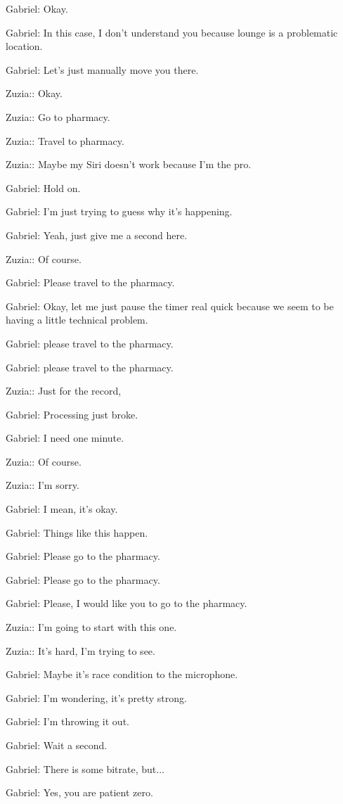 Gabriel: Okay.

Gabriel: In this case, I don't understand you because lounge is a problematic location.

Gabriel: Let's just manually move you there.

Zuzia:: Okay.

Zuzia:: Go to pharmacy.

Zuzia:: Travel to pharmacy.

Zuzia:: Maybe my Siri doesn't work because I'm the pro.

Gabriel: Hold on.

Gabriel: I'm just trying to guess why it's happening.

Gabriel: Yeah, just give me a second here.

Zuzia:: Of course.

Gabriel: Please travel to the pharmacy.

Gabriel: Okay, let me just pause the timer real quick because we seem to be having a little technical problem.

Gabriel: please travel to the pharmacy.

Gabriel: please travel to the pharmacy.

Zuzia:: Just for the record,

Gabriel: Processing just broke.

Gabriel: I need one minute.

Zuzia:: Of course.

Zuzia:: I'm sorry.

Gabriel: I mean, it's okay.

Gabriel: Things like this happen.

Gabriel: Please go to the pharmacy.

Gabriel: Please go to the pharmacy.

Gabriel: Please, I would like you to go to the pharmacy.

Zuzia:: I'm going to start with this one.

Zuzia:: It's hard, I'm trying to see.

Gabriel: Maybe it's race condition to the microphone.

Gabriel: I'm wondering, it's pretty strong.

Gabriel: I'm throwing it out.

Gabriel: Wait a second.

Gabriel: There is some bitrate, but...

Gabriel: Yes, you are patient zero.


